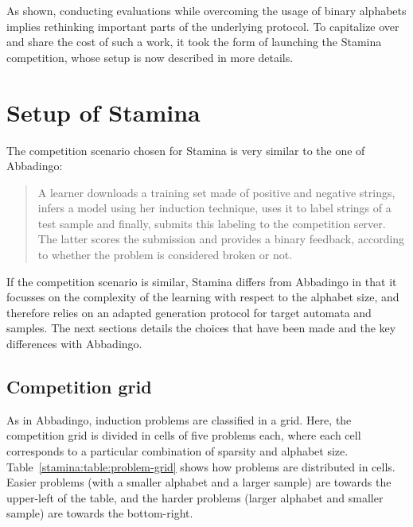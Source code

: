 As shown, conducting evaluations while overcoming the usage of binary alphabets implies rethinking important parts of the underlying protocol. To capitalize over and share the cost of such a work, it took the form of launching the Stamina competition, whose setup is now described in more details.


\section{Setup of Stamina\label{section:stamina-setup}}

The competition scenario chosen for Stamina is very similar to the one of Abbadingo: 

\begin{quotation}
A learner downloads a training set made of positive and negative strings, infers a model using her induction technique, uses it to label strings of a test sample and finally, submits this labeling to the competition server. The latter scores the submission and provides a binary feedback, according to whether the problem is considered broken or not.
\end{quotation}

If the competition scenario is similar, Stamina differs from Abbadingo in that it focusses on the complexity of the learning with respect to the alphabet size, and therefore relies on an adapted generation protocol for target automata and samples. The next sections details the choices that have been made and the key differences with Abbadingo.

\subsection{Competition grid}

As in Abbadingo, induction problems are classified in a grid. Here, the competition grid is divided in cells of five problems each, where each cell corresponds to a particular combination of sparsity and alphabet size. Table~\ref{stamina:table:problem-grid} shows how problems are distributed in cells. Easier problems (with a smaller alphabet and a larger sample) are towards the upper-left of the table, and the harder problems (larger alphabet and smaller sample) are towards the bottom-right.

